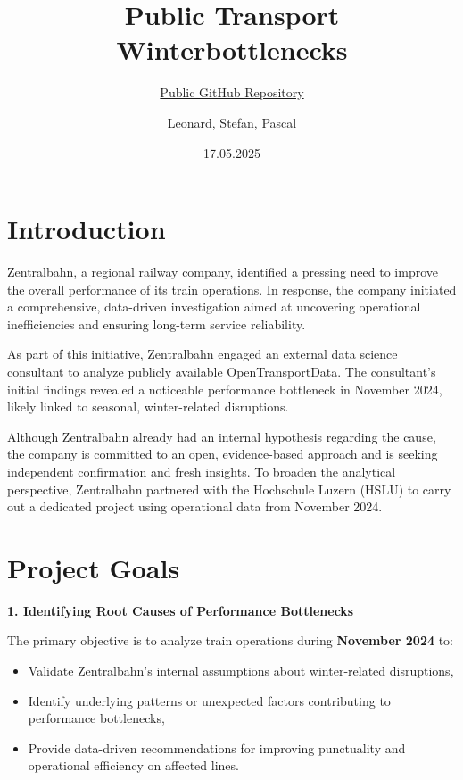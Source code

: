 \documentclass[
]{article}
\title{Public Transport Winterbottlenecks}
\subtitle{\href{https://github.com/paACode/publictransport_winterbottlenecks_palest}{Public
GitHub Repository}}
\author{Leonard, Stefan, Pascal}
\date{17.05.2025}
\providecommand{\tightlist}{%
  \setlength{\itemsep}{0pt}\setlength{\parskip}{0pt}}
\begin{document}
\maketitle

{
\setcounter{tocdepth}{3}
\tableofcontents
}
\section{Introduction}\label{introduction}

Zentralbahn, a regional railway company, identified a pressing need to
improve the overall performance of its train operations. In response,
the company initiated a comprehensive, data-driven investigation aimed
at uncovering operational inefficiencies and ensuring long-term service
reliability.

As part of this initiative, Zentralbahn engaged an external data science
consultant to analyze publicly available OpenTransportData. The
consultant's initial findings revealed a noticeable performance
bottleneck in November 2024, likely linked to seasonal, winter-related
disruptions.

Although Zentralbahn already had an internal hypothesis regarding the
cause, the company is committed to an open, evidence-based approach and
is seeking independent confirmation and fresh insights. To broaden the
analytical perspective, Zentralbahn partnered with the Hochschule Luzern
(HSLU) to carry out a dedicated project using operational data from
November 2024.

\section{Project Goals}\label{project-goals}

\textbf{1. Identifying Root Causes of Performance Bottlenecks}

The primary objective is to analyze train operations during
\textbf{November 2024} to:

\begin{itemize}
\tightlist
\item
  Validate Zentralbahn's internal assumptions about winter-related
  disruptions,
\item
  Identify underlying patterns or unexpected factors contributing to
  performance bottlenecks,
\item
  Provide data-driven recommendations for improving punctuality and
  operational efficiency on affected lines.
\end{itemize}
\end{document}
